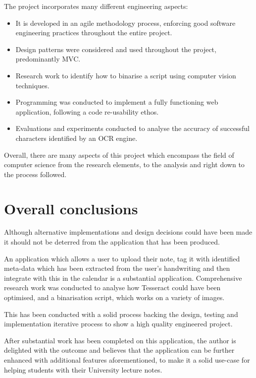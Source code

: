 The project incorporates many different engineering aspects:
\begin{itemize}
	\item It is developed in an agile methodology process, enforcing good software engineering practices throughout the entire project.
	\item Design patterns were considered and used throughout the project, predominantly MVC.
	\item Research work to identify how to binarise a script using computer vision techniques.
	\item Programming was conducted to implement a fully functioning web application, following a code re-usability ethos.
	\item Evaluations and experiments conducted to analyse the accuracy of successful characters identified by an OCR engine.
\end{itemize}

Overall, there are many aspects of this project which encompass the field of computer science from the research elements, to the analysis  and right down to the process followed.

\section{Overall conclusions}
Although alternative implementations and design decisions could have been made it should not be deterred from the application that has been produced.


An application which allows a user to upload their note, tag it with identified meta-data which has been extracted from the user's handwriting and then integrate with this in the calendar is a substantial application. Comprehensive research work was conducted to analyse how Tesseract could have been optimised, and a binarisation script, which works on a variety of images.

This has been conducted with a solid process backing the design, testing and implementation iterative process to show a high quality engineered project.

After substantial work has been completed on this application, the author is delighted with the outcome and believes that the application can be further enhanced with additional features aforementioned, to make it a solid use-case for helping students with their University lecture notes.
